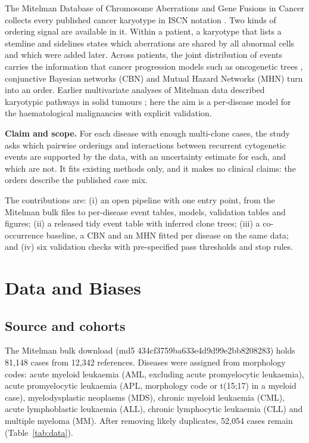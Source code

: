 \documentclass[conference]{IEEEtran}
\begin{document}
The Mitelman Database of Chromosome Aberrations and Gene Fusions in Cancer \cite{mitelman} collects every published cancer karyotype in ISCN notation \cite{iscn2020}. Two kinds of ordering signal are available in it. Within a patient, a karyotype that lists a stemline and sidelines states which aberrations are shared by all abnormal cells and which were added later. Across patients, the joint distribution of events carries the information that cancer progression models such as oncogenetic trees \cite{desper1999}, conjunctive Bayesian networks (CBN) \cite{beerenwinkel2007,gerstung2009} and Mutual Hazard Networks (MHN) \cite{schill2020} turn into an order. Earlier multivariate analyses of Mitelman data described karyotypic pathways in solid tumours \cite{hoglund2001}; here the aim is a per-disease model for the haematological malignancies with explicit validation.

\textbf{Claim and scope.} For each disease with enough multi-clone cases, the study asks which pairwise orderings and interactions between recurrent cytogenetic events are supported by the data, with an uncertainty estimate for each, and which are not. It fits existing methods only, and it makes no clinical claims: the orders describe the published case mix.

The contributions are: (i) an open pipeline with one entry point, from the Mitelman bulk files to per-disease event tables, models, validation tables and figures; (ii) a released tidy event table with inferred clone trees; (iii) a co-occurrence baseline, a CBN and an MHN fitted per disease on the same data; and (iv) six validation checks with pre-specified pass thresholds and stop rules.

\section{Data and Biases}
\subsection{Source and cohorts}
The Mitelman bulk download (md5 434cf3759ba633e4d9d99e2bb8208283) holds 81,148 cases from 12,342 references. Diseases were assigned from morphology codes: acute myeloid leukaemia (AML, excluding acute promyelocytic leukaemia), acute promyelocytic leukaemia (APL, morphology code or t(15;17) in a myeloid case), myelodysplastic neoplasms (MDS), chronic myeloid leukaemia (CML), acute lymphoblastic leukaemia (ALL), chronic lymphocytic leukaemia (CLL) and multiple myeloma (MM). After removing likely duplicates, 52,054 cases remain (Table~\ref{tab:data}).
\end{document}
